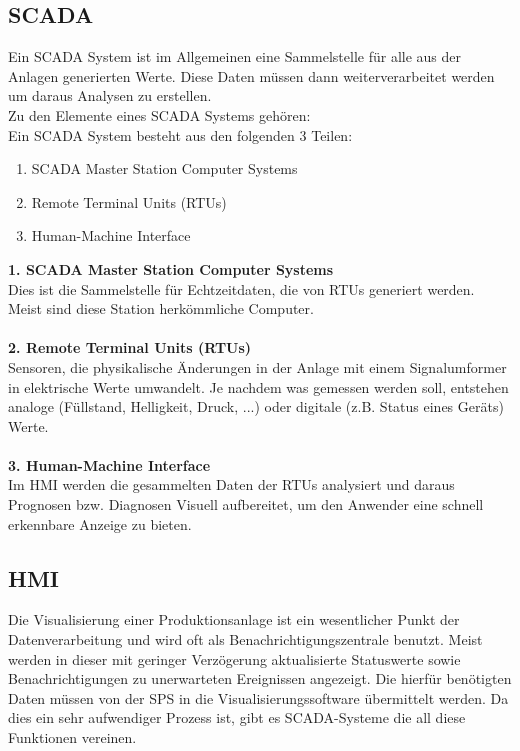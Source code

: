 \subsection{\ac{SCADA}}
Ein \ac{SCADA} System ist im Allgemeinen eine Sammelstelle für alle aus der Anlagen generierten Werte. Diese Daten müssen dann weiterverarbeitet werden um daraus Analysen zu erstellen.\\
Zu den Elemente eines \ac{SCADA} Systems gehören:\\
Ein \ac{SCADA} System besteht aus den folgenden 3 Teilen:
\begin{enumerate}
	\item \ac{SCADA} Master Station Computer Systems
	\item Remote Terminal Units (RTUs)
	\item Human-Machine Interface
\end{enumerate}

\textbf{1. \ac{SCADA} Master Station Computer Systems}\\
Dies ist die Sammelstelle für Echtzeitdaten, die von RTUs generiert werden. Meist sind diese Station herkömmliche Computer.\cite{scada_system} \\ 
\\
\textbf{2. Remote Terminal Units (RTUs)}\\
Sensoren, die physikalische Änderungen in der Anlage mit einem Signalumformer in elektrische Werte umwandelt. Je nachdem was gemessen werden soll, entstehen analoge (Füllstand, Helligkeit, Druck, ...) oder digitale (z.B. Status eines Geräts) Werte.\cite{scada_system} \\
\\
\textbf{3. Human-Machine Interface}\\
Im HMI werden die gesammelten Daten der RTUs analysiert und daraus Prognosen bzw. Diagnosen Visuell aufbereitet, um den Anwender eine schnell erkennbare Anzeige zu bieten.\cite{scada_system}

\subsection{HMI}
Die Visualisierung einer Produktionsanlage ist ein wesentlicher Punkt der Datenverarbeitung und wird oft als Benachrichtigungszentrale benutzt. Meist werden in dieser mit geringer Verzögerung aktualisierte Statuswerte sowie Benachrichtigungen zu unerwarteten Ereignissen angezeigt. Die hierfür benötigten Daten müssen von der \ac{SPS} in die Visualisierungssoftware übermittelt werden. Da dies ein sehr aufwendiger Prozess ist, gibt es \ac{SCADA}-Systeme die all diese Funktionen vereinen.\\
\\

